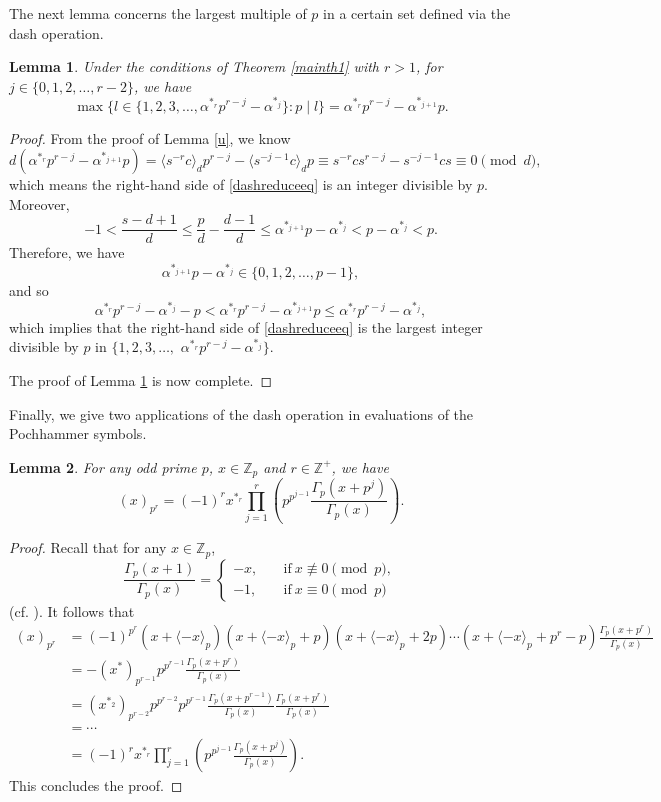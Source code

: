 \documentclass[12pt,reqno]{amsart}
\def\l{\left}
\def\r{\right}
\def\t{\text}
\def\f{\frac}
\def\eq{\equiv}
\def\Z{\mathbb Z}
\def\<{\langle}
\def\>{\rangle}
\theoremstyle{plain}
\newtheorem{lemma}{Lemma}[section]
\theoremstyle{definition}
\theoremstyle{remark}
\numberwithin{equation}{section}
\begin{document}
The next lemma concerns the largest multiple of $p$ in a certain set defined via the dash operation. 

\begin{lemma}\label{dashreduce}
Under the conditions of Theorem \ref{mainth1} with $r>1$, for $j\in\{0,1,2,\ldots,r-2\}$, we have
\begin{equation}\label{dashreduceeq}
\max\{l\in\{1,2,3,\ldots,\alpha^{\ast_r}p^{r-j}-\alpha^{\ast_j}\}:p\mid l\}=\alpha^{\ast_r}p^{r-j}-\alpha^{\ast_{j+1}}p.
\end{equation}
\end{lemma}

\begin{proof}
From the proof of Lemma \ref{u}, we know
$$
d(\alpha^{\ast_r}p^{r-j}-\alpha^{\ast_{j+1}}p)=\<s^{-r}c\>_dp^{r-j}-\<s^{-j-1}c\>_dp\eq s^{-r}cs^{r-j}-s^{-j-1}cs\eq0\pmod{d},
$$
which means the right-hand side of \eqref{dashreduceeq} is an integer divisible by  $p$. Moreover,
$$
-1<\f{s-d+1}{d}\leq\f{p}{d}-\f{d-1}{d}\leq\alpha^{\ast_{j+1}}p-\alpha^{\ast_{j}}<p-\alpha^{\ast_{j}}<p.
$$
Therefore, we have
$$
\alpha^{\ast_{j+1}}p-\alpha^{\ast_{j}}\in\{0,1,2,\ldots,p-1\},
$$
and so
$$
\alpha^{\ast_r}p^{r-j}-\alpha^{\ast_j}-p<\alpha^{\ast_r}p^{r-j}-\alpha^{\ast_{j+1}}p\leq \alpha^{\ast_r}p^{r-j}-\alpha^{\ast_j},
$$
which implies that the right-hand side of \eqref{dashreduceeq} is the largest integer divisible by $p$ in $\{1,2,3,\ldots,$ $ \alpha^{\ast_r}p^{r-j}-\alpha^{\ast_j}\}$.

The proof of Lemma \ref{dashreduce} is now complete.
\end{proof}

Finally, we give two applications of the dash operation in evaluations of the Pochhammer symbols.   
\begin{lemma}\label{pochreduce}
For any odd prime $p$, $x\in\Z_p$ and $r\in\Z^+$, we have
$$
(x)_{p^r}=(-1)^rx^{\ast_r}\prod_{j=1}^r\l(p^{p^{j-1}}\f{\Gamma_p(x+p^j)}{\Gamma_p(x)}\r).
$$
\end{lemma}

\begin{proof}
Recall that for any $x\in\Z_p$, 
$$
\f{\Gamma_p(x+1)}{\Gamma_p(x)}=\begin{cases}-x,\quad&\t{if}\ x\not\eq0\pmod{p},\\ -1,\quad&\t{if}\ x\eq0\pmod{p}\end{cases}
$$
(cf. \cite{Morita1975}). It follows that
\begin{align*}
(x)_{p^r}&=(-1)^{p^r}(x+\<-x\>_p)(x+\<-x\>_p+p)(x+\<-x\>_p+2p)\cdots(x+\<-x\>_p+p^r-p)\f{\Gamma_p(x+p^r)}{\Gamma_p(x)}\\
&=-(x^{\ast})_{p^{r-1}}p^{p^{r-1}}\f{\Gamma_p(x+p^r)}{\Gamma_p(x)}\\
&=(x^{\ast_2})_{p^{r-2}}p^{p^{r-2}}p^{p^{r-1}}\f{\Gamma_p(x+p^{r-1})}{\Gamma_p(x)}\f{\Gamma_p(x+p^r)}{\Gamma_p(x)}\\
&=\cdots\\
&=(-1)^rx^{\ast_r}\prod_{j=1}^r\l(p^{p^{j-1}}\f{\Gamma_p(x+p^j)}{\Gamma_p(x)}\r).
\end{align*}
This concludes the proof.
\end{proof}
\end{document}
